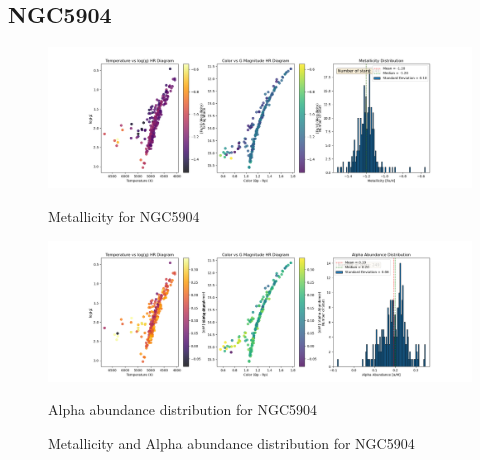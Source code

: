 \documentclass[a4paper,12pt]{article}
\begin{document}
\subsection{NGC5904}
\begin{figure}[H]
    \centering
    \begin{minipage}[b]{0.8\textwidth}
        \centering
        \includegraphics[width=\textwidth]{NGC5904_metalicity.png}
        \caption{Metallicity for NGC5904}
        \label{fig:NGC5904_metalicity}
    \end{minipage}
    \hfill
    \begin{minipage}[b]{0.8\textwidth}
        \centering
        \includegraphics[width=\textwidth]{NGC5904_alpha.png}
        \caption{Alpha abundance distribution for NGC5904}
        \label{fig:NGC5904_alpha}
    \end{minipage}
    \caption{Metallicity and Alpha abundance distribution for NGC5904}
    \label{fig:NGC5904_combined}
\end{figure}
\clearpage
\end{document}

